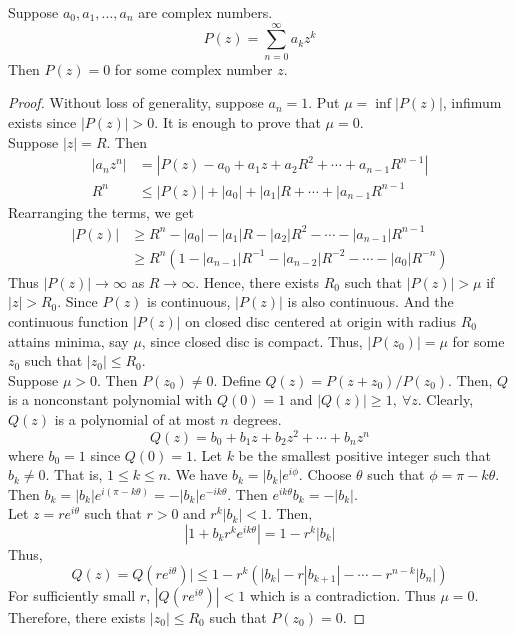\begin{theorem}
	Suppose $a_0,a_1,\dots,a_n$ are complex numbers.
	\[ P(z) = \sum_{n=0}^\infty a_k z^k \]
	Then $P(z) = 0$ for some complex number $z$.
\end{theorem}
\begin{proof}
	Without loss of generality, suppose $a_n = 1$.
	Put $\mu = \inf |P(z)|$, infimum exists since $|P(z)| > 0$.
	It is enough to prove that $\mu = 0$.\\

	Suppose $|z| = R$.
	Then
	\begin{align*}
		|a_n z^n|
		& = |P(z) - a_0 + a_1z + a_2R^2 + \dotsb + a_{n-1}R^{n-1}| \\
		R^n
		& \le |P(z)| + |a_0| + |a_1|R + \dotsb + |a_{n-1}R^{n-1} 
	\end{align*}
	Rearranging the terms, we get
	\begin{align*}
		|P(z)| 
		& \ge R^n - |a_0| - |a_1|R - |a_2|R^2 - \dotsb - |a_{n-1}|R^{n-1} \\
		& \ge R^n \left(1 - |a_{n-1}|R^{-1} - |a_{n-2}|R^{-2} - \dotsb - |a_0|R^{-n} \right)
	\end{align*}
	Thus $|P(z)| \to \infty$ as $R \to \infty$.
	Hence, there exists $R_0$ such that $|P(z)| > \mu$ if $|z| > R_0$.
	Since $P(z)$ is continuous, $|P(z)|$ is also continuous.
	And the continuous function $|P(z)|$ on closed disc centered at origin with radius $R_0$ attains minima, say $\mu$, since closed disc is compact.
	Thus, $|P(z_0)| = \mu$ for some $z_0$ such that $|z_0| \le R_0$.\\

	Suppose $\mu > 0$.
	Then $P(z_0) \ne 0$.
	Define $Q(z) = P(z+z_0)/P(z_0)$.
	Then, $Q$ is a nonconstant polynomial with $Q(0) = 1$ and $|Q(z)| \ge 1,\ \forall z$.
	Clearly, $Q(z)$ is a polynomial of at most $n$ degrees.
	\[ Q(z) = b_0 + b_1z + b_2z^2 + \dotsb + b_n z^n \]
	where $b_0 = 1$ since $Q(0) = 1$.
	Let $k$ be the smallest positive integer such that $b_k \ne 0$.
	That is, $1 \le k \le n$.
	We have $b_k = |b_k| e^{i\phi}$.
	Choose $\theta$ such that $\phi = \pi-k\theta$.
	Then $b_k = |b_k|e^{i(\pi-k\theta)} = -|b_k|e^{-ik\theta}$.
	Then $e^{ik\theta}b_k = -|b_k|$.\\

	Let $z = re^{i\theta}$ such that $r > 0$ and $r^k|b_k| < 1$.
	Then,
	\[ |1+b_kr^ke^{ik\theta}| = 1 - r^k|b_k| \]
	Thus,
	\[ Q(z) = Q(re^{i\theta})| \le 1 - r^k\left(|b_k|-r|b_{k+1}| - \dotsb - r^{n-k}|b_n| \right) \]
	For sufficiently small $r$, $|Q(re^{i\theta})| < 1$ which is a contradiction.
	Thus $\mu = 0$.
	Therefore, there exists $|z_0| \le R_0$ such that $P(z_0) = 0$.
\end{proof}

